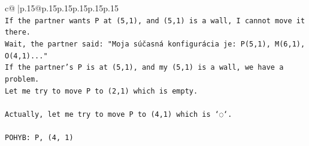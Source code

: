 \documentclass{article}
\begin{document}
{\begin{supertabular}{c@{$\;$}|p{.15\linewidth}@{}p{.15\linewidth}p{.15\linewidth}p{.15\linewidth}p{.15\linewidth}p{.15\linewidth}}
{{{\\ 
\texttt{If the partner wants P at (5,1), and (5,1) is a wall, I cannot move it there.} \\
\texttt{Wait, the partner said: "Moja súčasná konfigurácia je: P(5,1), M(6,1), O(4,1)..."} \\
\texttt{If the partner's P is at (5,1), and my (5,1) is a wall, we have a problem.} \\
\texttt{Let me try to move P to (2,1) which is empty.} \\
\\ 
\texttt{Actually, let me try to move P to (4,1) which is `◌`.} \\
\\ 
\texttt{POHYB: P, (4, 1)} \\
            }
        }
    }
     \\ \\


\end{supertabular}}
\end{document}
